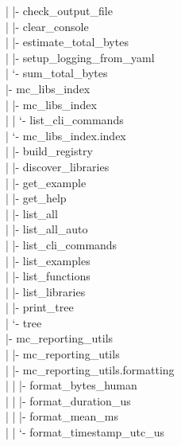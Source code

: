 \documentclass[11pt]{article}
\begin{document}
\textcolor{TreeLevelThree}{|     |- check\_output\_file}\\
\textcolor{TreeLevelThree}{|     |- clear\_console}\\
\textcolor{TreeLevelThree}{|     |- estimate\_total\_bytes}\\
\textcolor{TreeLevelThree}{|     |- setup\_logging\_from\_yaml}\\
\textcolor{TreeLevelThree}{|     `- sum\_total\_bytes}\\
\textcolor{TreeLevelOne}{|- mc\_libs\_index}\\
\textcolor{TreeLevelTwo}{|  |- mc\_libs\_index}\\
\textcolor{TreeLevelThree}{|  |  `- list\_cli\_commands}\\
\textcolor{TreeLevelTwo}{|  `- mc\_libs\_index.index}\\
\textcolor{TreeLevelThree}{|     |- build\_registry}\\
\textcolor{TreeLevelThree}{|     |- discover\_libraries}\\
\textcolor{TreeLevelThree}{|     |- get\_example}\\
\textcolor{TreeLevelThree}{|     |- get\_help}\\
\textcolor{TreeLevelThree}{|     |- list\_all}\\
\textcolor{TreeLevelThree}{|     |- list\_all\_auto}\\
\textcolor{TreeLevelThree}{|     |- list\_cli\_commands}\\
\textcolor{TreeLevelThree}{|     |- list\_examples}\\
\textcolor{TreeLevelThree}{|     |- list\_functions}\\
\textcolor{TreeLevelThree}{|     |- list\_libraries}\\
\textcolor{TreeLevelThree}{|     |- print\_tree}\\
\textcolor{TreeLevelThree}{|     `- tree}\\
\textcolor{TreeLevelOne}{|- mc\_reporting\_utils}\\
\textcolor{TreeLevelTwo}{|  |- mc\_reporting\_utils}\\
\textcolor{TreeLevelTwo}{|  |- mc\_reporting\_utils.formatting}\\
\textcolor{TreeLevelThree}{|  |  |- format\_bytes\_human}\\
\textcolor{TreeLevelThree}{|  |  |- format\_duration\_us}\\
\textcolor{TreeLevelThree}{|  |  |- format\_mean\_ms}\\
\textcolor{TreeLevelThree}{|  |  `- format\_timestamp\_utc\_us}\\
\end{document}
